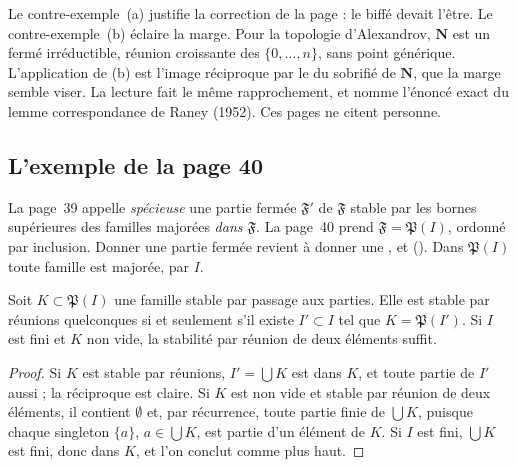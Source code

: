 \noindent Le contre-exemple~(a) justifie la correction de la page : le  biffé devait l'être. Le contre-exemple~(b) éclaire la marge. Pour la topologie d'Alexandrov, $\mathbf N$ est un fermé irréductible, réunion croissante des $\{0, \dots, n\}$, sans point générique. L'application de (b) est l'image réciproque par le  du sobrifié de $\mathbf N$, que la marge semble viser. La lecture fait le même rapprochement, et nomme l'énoncé exact du lemme correspondance de Raney (1952). Ces pages ne citent personne.

\subsection*{L'exemple de la page 40}

La page~39 appelle \emph{spécieuse} une partie fermée $\mathfrak F'$ de $\mathfrak F$ stable par les bornes supérieures des familles majorées \emph{dans $\mathfrak F$}. La page~40 prend $\mathfrak F = \mathfrak P(I)$, ordonné par inclusion. Donner une partie fermée revient à donner une , et  (). Dans $\mathfrak P(I)$ toute famille est majorée, par $I$.

\begin{enonce}[Page 40]
Soit $K \subset \mathfrak P(I)$ une famille stable par passage aux parties. Elle est stable par réunions quelconques si et seulement s'il existe $I' \subset I$ tel que $K = \mathfrak P(I')$. Si $I$ est fini et $K$ non vide, la stabilité par réunion de deux éléments suffit.
\end{enonce}

\begin{proof}
Si $K$ est stable par réunions, $I' = \bigcup K$ est dans $K$, et toute partie de $I'$ aussi ; la réciproque est claire. Si $K$ est non vide et stable par réunion de deux éléments, il contient $\emptyset$ et, par récurrence, toute partie finie de $\bigcup K$, puisque chaque singleton $\{a\}$, $a \in \bigcup K$, est partie d'un élément de $K$. Si $I$ est fini, $\bigcup K$ est fini, donc dans $K$, et l'on conclut comme plus haut.
\end{proof}

